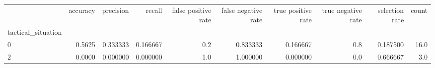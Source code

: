 \begin{tabular}{lrrrrrrrrr}
\toprule
{} &  accuracy &  precision &    recall &  false positive rate &  false negative rate &  true positive rate &  true negative rate &  selection rate &  count \\
tactical\_situation &           &            &           &                      &                      &                     &                     &                 &        \\
\midrule
0                  &    0.5625 &   0.333333 &  0.166667 &                  0.2 &             0.833333 &            0.166667 &                 0.8 &        0.187500 &   16.0 \\
2                  &    0.0000 &   0.000000 &  0.000000 &                  1.0 &             1.000000 &            0.000000 &                 0.0 &        0.666667 &    3.0 \\
\bottomrule
\end{tabular}
